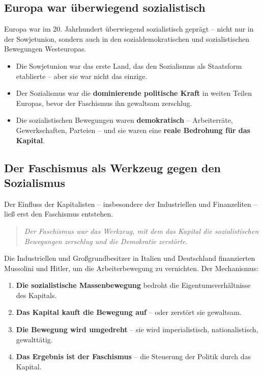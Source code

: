 \subsection{Europa war überwiegend sozialistisch}

Europa war im 20. Jahrhundert überwiegend sozialistisch geprägt – nicht nur in der Sowjetunion, sondern auch in den sozialdemokratischen und sozialistischen Bewegungen Westeuropas.

\begin{itemize}
    \item Die Sowjetunion war das erste Land, das den Sozialismus als Staatsform etablierte – aber sie war nicht das einzige.
    \item Der Sozialismus war die \textbf{dominierende politische Kraft} in weiten Teilen Europas, bevor der Faschismus ihn gewaltsam zerschlug.
    \item Die sozialistischen Bewegungen waren \textbf{demokratisch} – Arbeiterräte, Gewerkschaften, Parteien – und sie waren eine \textbf{reale Bedrohung für das Kapital}.
\end{itemize}

\subsection{Der Faschismus als Werkzeug gegen den Sozialismus}

Der Einfluss der Kapitalisten – insbesondere der Industriellen und Finanzeliten – ließ erst den Faschismus entstehen.

\begin{quote}
\emph{Der Faschismus war das Werkzeug, mit dem das Kapital die sozialistischen Bewegungen zerschlug und die Demokratie zerstörte.}
\end{quote}

Die Industriellen und Großgrundbesitzer in Italien und Deutschland finanzierten Mussolini und Hitler, um die Arbeiterbewegung zu vernichten. Der Mechanismus:

\begin{enumerate}
    \item \textbf{Die sozialistische Massenbewegung} bedroht die Eigentumsverhältnisse des Kapitals.
    \item \textbf{Das Kapital kauft die Bewegung auf} – oder zerstört sie gewaltsam.
    \item \textbf{Die Bewegung wird umgedreht} – sie wird imperialistisch, nationalistisch, gewalttätig.
    \item \textbf{Das Ergebnis ist der Faschismus} – die Steuerung der Politik durch das Kapital.
\end{enumerate}

